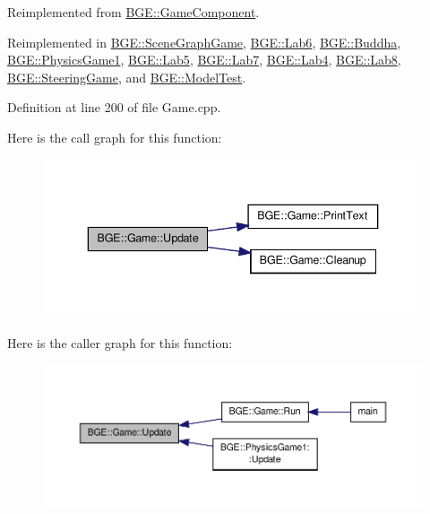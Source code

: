 Reimplemented from \hyperlink{class_b_g_e_1_1_game_component_ac8e444827ee0be9ad654cdff4d15f071}{B\-G\-E\-::\-Game\-Component}.



Reimplemented in \hyperlink{class_b_g_e_1_1_scene_graph_game_a0da77898a630ba53d2ca512f2992f7fb}{B\-G\-E\-::\-Scene\-Graph\-Game}, \hyperlink{class_b_g_e_1_1_lab6_ace5577edb1f9c38e007f20b843fe1030}{B\-G\-E\-::\-Lab6}, \hyperlink{class_b_g_e_1_1_buddha_a0723abeec23fa78f7d8c830e04c59746}{B\-G\-E\-::\-Buddha}, \hyperlink{class_b_g_e_1_1_physics_game1_ae67a81b2bd9fda6538266bb86b3e37f5}{B\-G\-E\-::\-Physics\-Game1}, \hyperlink{class_b_g_e_1_1_lab5_ae58b0a0640c84a48825a969f8e1396db}{B\-G\-E\-::\-Lab5}, \hyperlink{class_b_g_e_1_1_lab7_a0e9a409b00ca05c7eeff78cd5aef4f6e}{B\-G\-E\-::\-Lab7}, \hyperlink{class_b_g_e_1_1_lab4_a34fe4d66f91e194a4b129950b4966cfb}{B\-G\-E\-::\-Lab4}, \hyperlink{class_b_g_e_1_1_lab8_abc19add5c6e7fa56977f06c370393be1}{B\-G\-E\-::\-Lab8}, \hyperlink{class_b_g_e_1_1_steering_game_a09cc97712a026e87a229117021998153}{B\-G\-E\-::\-Steering\-Game}, and \hyperlink{class_b_g_e_1_1_model_test_a27dddd734ca2a9dfd49396707834571b}{B\-G\-E\-::\-Model\-Test}.



Definition at line 200 of file Game.\-cpp.



Here is the call graph for this function\-:
\nopagebreak
\begin{figure}[H]
\begin{center}
\leavevmode
\includegraphics[width=340pt]{class_b_g_e_1_1_game_a51ed573392d7bed791b67062e7c7a3d4_cgraph}
\end{center}
\end{figure}




Here is the caller graph for this function\-:
\nopagebreak
\begin{figure}[H]
\begin{center}
\leavevmode
\includegraphics[width=350pt]{class_b_g_e_1_1_game_a51ed573392d7bed791b67062e7c7a3d4_icgraph}
\end{center}
\end{figure}




